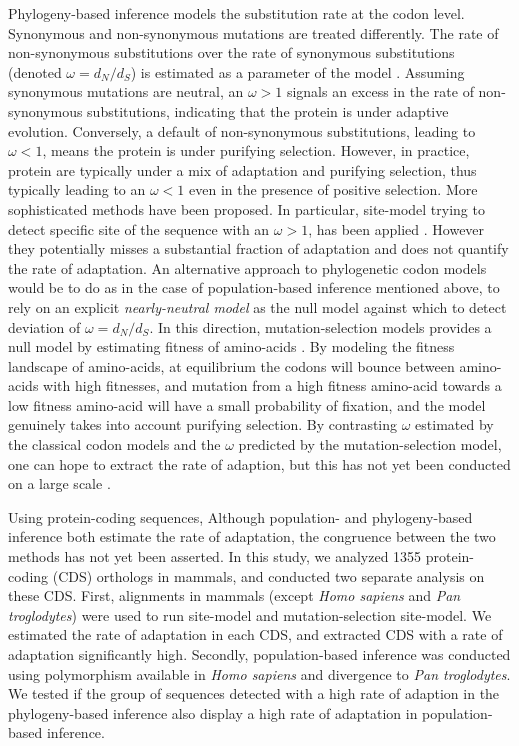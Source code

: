 \documentclass[10pt]{article}
\begin{document}
\begin{multicols}{2}
	Phylogeny-based inference models the substitution rate at the codon level. Synonymous and non-synonymous mutations are treated differently. The rate of non-synonymous substitutions over the rate of synonymous substitutions (denoted $\omega=d_N/d_S$) is estimated as a parameter of the model \cite{Muse1994,Goldman1994}. Assuming synonymous mutations are neutral, an $\omega>1$ signals an excess in the rate of non-synonymous substitutions, indicating that the protein is under adaptive evolution. Conversely, a default of non-synonymous substitutions, leading to $\omega<1$, means the protein is under purifying selection. However, in practice, protein are typically under a mix of adaptation and purifying selection, thus typically leading to an $\omega<1$ even in the presence of positive selection. More sophisticated methods have been proposed. In particular, site-model trying to detect specific site of the sequence with an $\omega>1$, has been applied \cite{Yang2001, kosiol_patterns_2008}. However they potentially misses a substantial fraction of adaptation and does not quantify the rate of adaptation. An alternative approach to phylogenetic codon models would be to do as in the case of population-based inference mentioned above, to rely on an explicit \textit{nearly-neutral model} as the null model against which to detect deviation of $\omega=d_N/d_S$. In this direction, mutation-selection models provides a null model by estimating fitness of amino-acids \cite{Yang2008, Halpern1998, Rodrigue2010}. By modeling the fitness landscape of amino-acids, at equilibrium the codons will bounce between amino-acids with high fitnesses, and mutation from a high fitness amino-acid towards a low fitness amino-acid will have a small probability of fixation, and the model genuinely takes into account purifying selection. By contrasting $\omega$ estimated by the classical codon models and the $\omega$ predicted by the mutation-selection model, one can hope to extract the rate of adaption, but this has not yet been conducted on a large scale \cite{Rodrigue2016}.
	
	Using protein-coding sequences, 
	Although population- and phylogeny-based inference both estimate the rate of adaptation, the congruence between the two methods has not yet been asserted. In this study, we analyzed 1355 protein-coding (CDS) orthologs in mammals, and conducted two separate analysis on these CDS. First, alignments in mammals (except \textit{Homo sapiens} and \textit{Pan troglodytes}) were used to run site-model and mutation-selection site-model. We estimated the rate of adaptation in each CDS, and extracted CDS with a rate of adaptation significantly high. Secondly, population-based inference was conducted using polymorphism available in \textit{Homo sapiens} and divergence to \textit{Pan troglodytes}. We tested if the group of sequences detected with a high rate of adaption in the phylogeny-based inference also display a high rate of adaptation in population-based inference.


\end{multicols}
\end{document}
